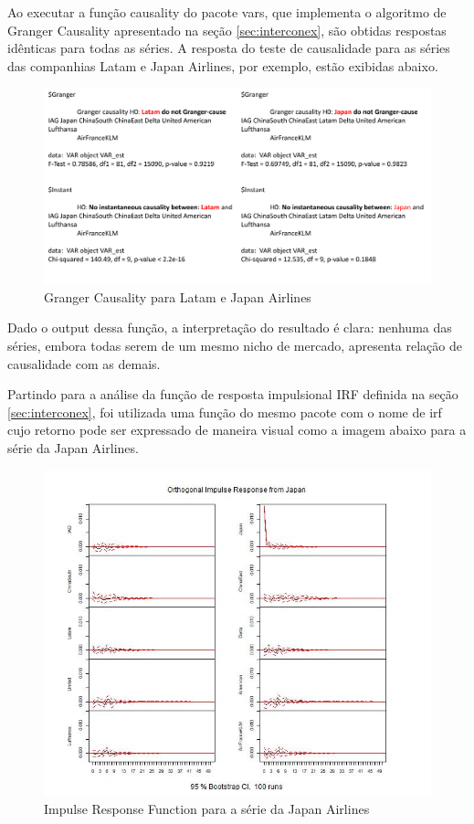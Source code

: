 \documentclass[12pt]{article}
\begin{document}
	Ao executar a função \textrm{causality} do pacote \textrm{vars}, que implementa o algoritmo de \textrm{Granger Causality} apresentado na seção \ref{sec:interconex}, são obtidas respostas idênticas para todas as séries. A resposta do teste de causalidade para as séries das companhias Latam e Japan Airlines, por exemplo, estão exibidas abaixo.
	
	\begin{figure}[H]
		\centering
		\includegraphics[width=0.9\linewidth]{Imagens/GrangerCausality}
		\caption{Granger Causality para Latam e Japan Airlines}
		\label{fig:grangercausality}
	\end{figure}
	
	Dado o output dessa função, a interpretação do resultado é clara: nenhuma das séries, embora todas serem de um mesmo nicho de mercado, apresenta relação de causalidade com as demais.
	
	Partindo para a análise da função de resposta impulsional \textrm{IRF} definida na seção \ref{sec:interconex}, foi utilizada uma função do mesmo pacote com o nome de \textrm{irf} cujo retorno pode ser expressado de maneira visual como a imagem abaixo para a série da Japan Airlines.
	
	\begin{figure}[H]
		\centering
		\includegraphics[width=0.9\linewidth]{Imagens/IRF_Japan}
		\caption{Impulse Response Function para a série da Japan Airlines}
		\label{fig:irfjapan}
	\end{figure}
	
\end{document}
